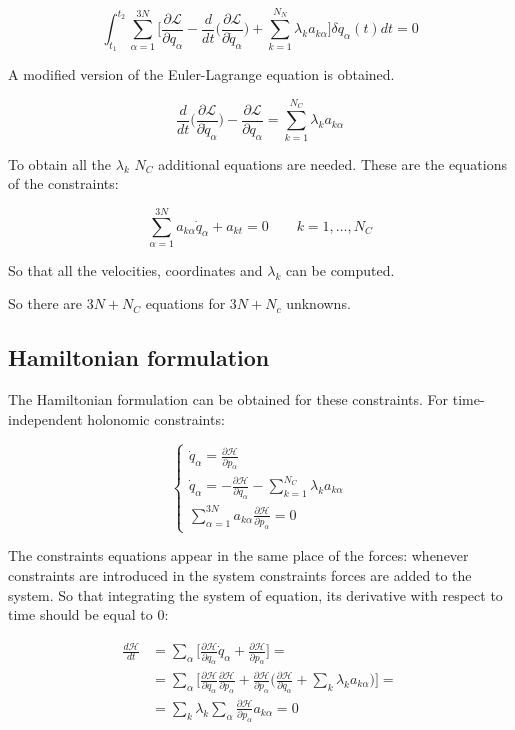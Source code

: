 	$$\int_{t_1}^{t_2}\sum\limits_{\alpha=1}^{3N}\biggl[\frac{\partial\mathcal{L}}{\partial q_\alpha} - \frac{d}{dt}\biggl(\frac{\partial\mathcal{L}}{\partial\dot{q}_\alpha}\biggr) + \sum\limits_{k=1}^{N_N}\lambda_ka_{k\alpha}\biggr]\delta q_\alpha(t)dt = 0$$

	A modified version of the Euler-Lagrange equation is obtained.

	$$\frac{d}{dt}\biggl(\frac{\partial\mathcal{L}}{\partial\dot{q}_\alpha}\biggr) - \frac{\partial\mathcal{L}}{\partial q_\alpha} = \sum\limits_{k=1}^{N_C}\lambda_k a_{k\alpha}$$

	To obtain all the $\lambda_k$ $N_C$ additional equations are needed.
	These are the equations of the constraints:

	$$\sum\limits_{\alpha=1}^{3N}a_{k\alpha}\dot{q}_\alpha + a_{kt} = 0\qquad k = 1, \dots, N_C$$

	So that all the velocities, coordinates and $\lambda_k$ can be computed.

	So there are $3N+N_C$ equations for $3N+N_c$ unknowns.

	\subsection{Hamiltonian formulation}
	The Hamiltonian formulation can be obtained for these constraints.
	For time-independent holonomic constraints:

	$$\begin{cases}\dot{q}_\alpha = \frac{\partial\mathcal{H}}{\partial p_\alpha}\\\dot{q}_\alpha = -\frac{\partial\mathcal{H}}{\partial q_\alpha} - \sum\limits_{k=1}^{N_C}\lambda_ka_{k\alpha}\\\sum\limits_{\alpha=1}^{3N}a_{k\alpha}\frac{\partial\mathcal{H}}{\partial p_\alpha} = 0\end{cases}$$

	The constraints equations appear in the same place of the forces: whenever constraints are introduced in the system constraints forces are added to the system.
	So that integrating the system of equation, its derivative with respect to time should be equal to $0$:

	\begin{align*}
		\frac{d\mathcal{H}}{dt} &= \sum\limits_\alpha\biggl[\frac{\partial\mathcal{H}}{\partial q_\alpha}\dot{q}_\alpha +\frac{\partial\mathcal{H}}{\partial p_\alpha}\biggr] = \\
														&=\sum\limits_\alpha\biggl[\frac{\partial\mathcal{H}}{\partial q_\alpha}\frac{\partial\mathcal{H}}{\partial p_\alpha} + \frac{\partial\mathcal{H}}{\partial p_\alpha}\biggl(\frac{\partial\mathcal{H}}{\partial q_\alpha} + \sum\limits_k \lambda_ka_{k\alpha}\biggr)\biggr] = \\
														&=\sum\limits_k\lambda_k\sum\limits_\alpha\frac{\partial\mathcal{H}}{\partial p_\alpha}a_{k\alpha} = 0
	\end{align*}

